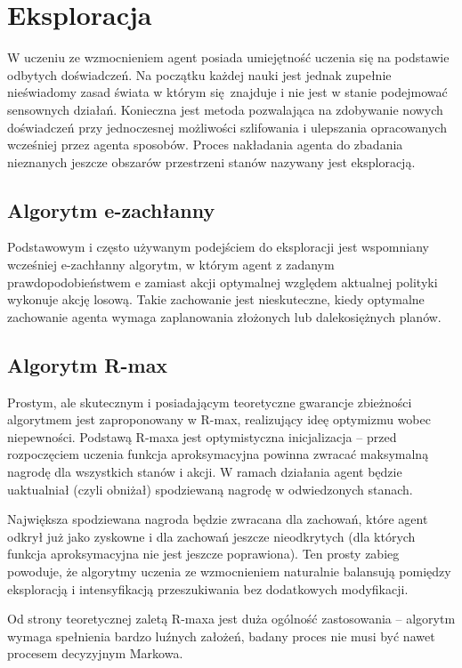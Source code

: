 \section{Eksploracja}
W uczeniu ze wzmocnieniem agent posiada umiejętność uczenia się na podstawie odbytych doświadczeń. Na początku każdej nauki jest jednak zupełnie nieświadomy zasad świata w którym się znajduje i nie jest w stanie podejmować sensownych działań. Konieczna jest metoda pozwalająca na zdobywanie nowych doświadczeń przy jednoczesnej możliwości szlifowania i ulepszania opracowanych wcześniej przez agenta sposobów. Proces nakładania agenta do zbadania nieznanych jeszcze obszarów przestrzeni stanów nazywany jest eksploracją.

\subsection{Algorytm e-zachłanny}
Podstawowym i często używanym podejściem do eksploracji jest wspomniany wcześniej e-zachłanny algorytm, w którym agent z zadanym prawdopodobieństwem e zamiast akcji optymalnej względem aktualnej polityki wykonuje akcję losową. Takie zachowanie jest nieskuteczne, kiedy optymalne zachowanie agenta wymaga zaplanowania złożonych lub dalekosiężnych planów.

\subsection{Algorytm R-max}
Prostym, ale skutecznym i posiadającym teoretyczne gwarancje zbieżności algorytmem jest zaproponowany w \cite{brafman02} R-max, realizujący ideę optymizmu wobec niepewności. Podstawą R-maxa jest optymistyczna inicjalizacja – przed rozpoczęciem uczenia funkcja aproksymacyjna powinna zwracać maksymalną nagrodę dla wszystkich stanów i akcji. W ramach działania agent będzie uaktualniał (czyli obniżał) spodziewaną nagrodę w odwiedzonych stanach.

Największa spodziewana nagroda będzie zwracana dla zachowań, które agent odkrył już jako zyskowne i dla zachowań jeszcze nieodkrytych (dla których funkcja aproksymacyjna nie jest jeszcze poprawiona). Ten prosty zabieg powoduje, że algorytmy uczenia ze wzmocnieniem naturalnie balansują pomiędzy eksploracją i intensyfikacją przeszukiwania bez dodatkowych modyfikacji.

Od strony teoretycznej zaletą R-maxa jest duża ogólność zastosowania – algorytm wymaga spełnienia bardzo luźnych założeń, badany proces nie musi być nawet procesem decyzyjnym Markowa.

